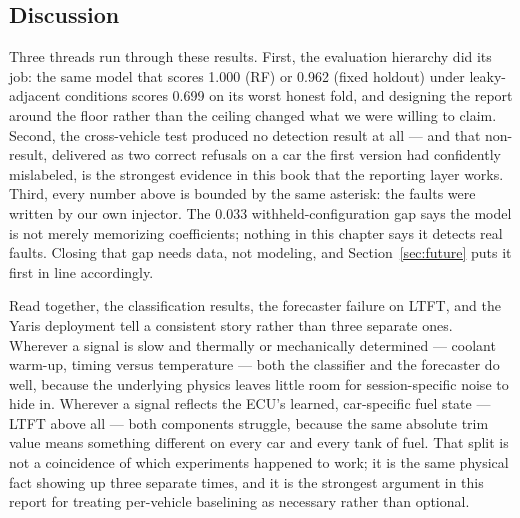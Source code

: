 \subsection{Discussion}

Three threads run through these results. First, the evaluation hierarchy
did its job: the same model that scores 1.000 (RF) or 0.962 (fixed holdout)
under leaky-adjacent conditions scores 0.699 on its worst honest fold, and
designing the report around the floor rather than the ceiling changed what
we were willing to claim. Second, the cross-vehicle test produced no
detection result at all --- and that non-result, delivered as two correct
refusals on a car the first version had confidently mislabeled, is the
strongest evidence in this book that the reporting layer works. Third,
every number above is bounded by the same asterisk: the faults were written
by our own injector. The 0.033 withheld-configuration gap says the model is
not merely memorizing coefficients; nothing in this chapter says it detects
real faults. Closing that gap needs data, not modeling, and
Section~\ref{sec:future} puts it first in line accordingly.

Read together, the classification results, the forecaster failure on LTFT,
and the Yaris deployment tell a consistent story rather than three separate
ones. Wherever a signal is slow and thermally or mechanically determined
--- coolant warm-up, timing versus temperature --- both the classifier and
the forecaster do well, because the underlying physics leaves little room
for session-specific noise to hide in. Wherever a signal reflects the
ECU's learned, car-specific fuel state --- LTFT above all --- both
components struggle, because the same absolute trim value means something
different on every car and every tank of fuel. That split is not a
coincidence of which experiments happened to work; it is the same physical
fact showing up three separate times, and it is the strongest argument in
this report for treating per-vehicle baselining as necessary rather than
optional.
